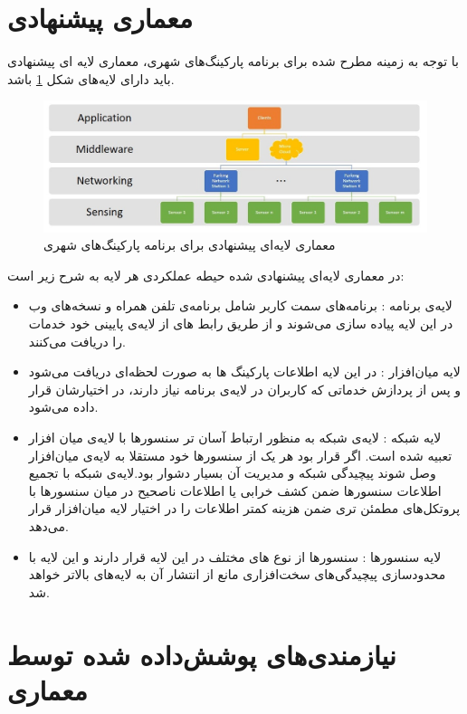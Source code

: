 \section{معماری پیشنهادی}
با توجه به زمینه مطرح شده برای برنامه پارکینگ‌های شهری، معماری لایه ای پیشنهادی باید دارای لایه‌های شکل \ref{fig:parking_layer} باشد.
\begin{figure}[h]
\centering
\includegraphics[scale=0.6]{parking_layer.jpg}
\caption{معماری لایه‌ای پیشنهادی برای برنامه پارکینگ‌های شهری}
\label{fig:parking_layer}
\end{figure}
در معماری لایه‌ای پیشنهادی شده حیطه عملکردی هر لایه به شرح زیر است:
\begin{itemize}
\item
لایه‌ی برنامه : برنامه‌های سمت کاربر شامل برنامه‌ی تلفن همراه و نسخه‌های وب در این لایه پیاده سازی می‌شوند و از طریق رابط های از لایه‌ی پایینی خود خدمات را دریافت می‌کنند.
\item
لایه میان‌افزار : در این لایه اطلاعات پارکینگ ها به صورت لحظه‌ای دریافت می‌شود و پس از پردازش خدماتی که کاربران در لایه‌ی برنامه نیاز دارند، در اختیارشان قرار داده می‌شود.
\item
لایه شبکه  : لایه‌ی شبکه به منظور ارتباط آسان تر سنسور‌ها با لایه‌ی میان افزار تعبیه شده است. اگر قرار بود هر یک از سنسور‌ها خود مستقلا به لایه‌ی میان‌افزار وصل شوند پیچیدگی شبکه و مدیریت آن بسیار دشوار بود.لایه‌ی شبکه با تجمیع اطلاعات سنسور‌ها ضمن کشف خرابی یا اطلاعات ناصحیح در میان سنسور‌ها با پروتکل‌های مطمئن تری ضمن هزینه کمتر اطلاعات را در اختیار لایه میان‌افزار قرار می‌دهد.
\item
لایه سنسور‌ها : سنسور‌ها از نوع های مختلف در این لایه قرار دارند و این لایه با محدود‌سازی پیچیدگی‌های سخت‌افزاری مانع از انتشار آن به لایه‌های بالاتر خواهد شد.
\end{itemize}
\section{نیازمندی‌های پوشش‌داده شده توسط معماری}